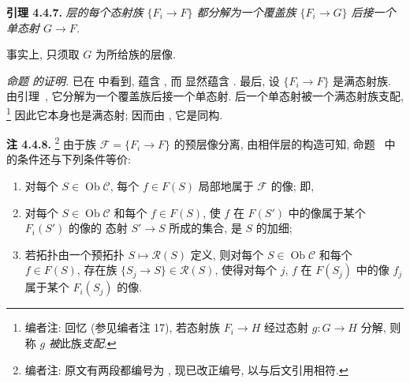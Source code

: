 
\setcounter{footnote}{34}

\medskip
\noindent{}\textbf{引理 4.4.7.}
\textit{层的每个态射族 \(\{F_i\to F\}\) 都分解为一个覆盖族
\(\{F_i\to G\}\) 后接一个单态射 \(G\to F\).}

事实上, 只须取 \(G\) 为所给族的层像.

\medskip
\noindent\textit{命题  的证明.}
已在  中看到,
 蕴含
, 而
 显然蕴含
.
最后, 设 \(\{F_i\to F\}\) 是满态射族.
由引理~,
它分解为一个覆盖族后接一个单态射. 后一个单态射被一个满态射族支配,
\footnote{编者注: 回忆 (参见编者注 17), 若态射族 \(F_i\to H\)
经过态射 \(g:G\to H\) 分解, 则称 \(g\) \emph{被}此族\emph{支配}.}
因此它本身也是满态射; 因而由 , 它是同构.

\medskip
\noindent{}\textbf{注 4.4.8.}
\footnote{编者注: 原文有两段都编号为 ,
现已改正编号, 以与后文引用相符.}
由于族 \(\mathscr F=\{F_i\to F\}\) 的预层像分离,
由相伴层的构造可知, 命题~
中的条件还与下列条件等价:
\begin{enumerate}
  \item[(v)]
    对每个 \(S\in\operatorname{Ob}\mathscr C\),
    每个 \(f\in F(S)\) 局部地属于 \(\mathscr F\) 的像; 即,

  \item[(vi)]
    对每个 \(S\in\operatorname{Ob}\mathscr C\) 和每个 \(f\in F(S)\),
    使 \(f\) 在 \(F(S')\) 中的像属于某个 \(F_i(S')\) 的像的
    态射 \(S'\to S\) 所成的集合, 是 \(S\) 的加细;

  \item[(vii)]
    若拓扑由一个预拓扑 \(S\mapsto\mathscr R(S)\) 定义,
    则对每个 \(S\in\operatorname{Ob}\mathscr C\) 和每个 \(f\in F(S)\),
    存在族 \(\{S_j\to S\}\in\mathscr R(S)\),
    使得对每个 \(j\), \(f\) 在 \(F(S_j)\) 中的像 \(f_j\)
    属于某个 \(F_i(S_j)\) 的像.
\end{enumerate}

